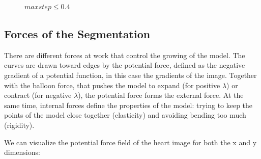 \begin{figure}[!hbt]
\centering   
{}
\caption{$maxstep \leq 0.4$}
\label{fig:max_leq}
\end{figure}

\subsection{Forces of the Segmentation}
\label{sub:forces}

There are different forces at work that control the growing of the model. The curves are drawn toward edges by the potential force, defined as the negative gradient of a potential function, in this case the gradients of the image. Together with the balloon force, that pushes the model to expand (for positive $\lambda$) or contract (for negative $\lambda$), the potential force forms the external force. At the same time, internal forces define the properties of the model: trying to keep the points of the model close together (elasticity) and avoiding bending too much (rigidity). 

We can visualize the potential force field of the heart image for both the x and y dimensions:

